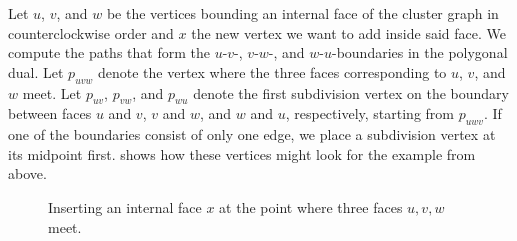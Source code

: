 Let $u$, $v$, and $w$ be the vertices bounding an internal face of the cluster graph in counterclockwise order and $x$ the new vertex we want to add inside said face. We compute the paths that form the $u$-$v$-, $v$-$w$-, and $w$-$u$-boundaries in the polygonal dual. Let $p_{uvw}$ denote the vertex where the three faces corresponding to $u$, $v$, and $w$ meet. Let $p_{uv}$, $p_{vw}$, and $p_{wu}$ denote the first subdivision vertex on the boundary between faces $u$ and $v$, $v$ and $w$, and $w$ and $u$, respectively, starting from $p_{uwv}$. If one of the boundaries consist of only one edge, we place a subdivision vertex at its midpoint first.  shows how these vertices might look for the example from above.

\begin{figure}[H]
	\centering
	\quad
	\quad
	\caption{Inserting an internal face $x$ at the point where three faces $u,v,w$ meet.}
	\label{fig:insert-vertex-illustration}
\end{figure}

